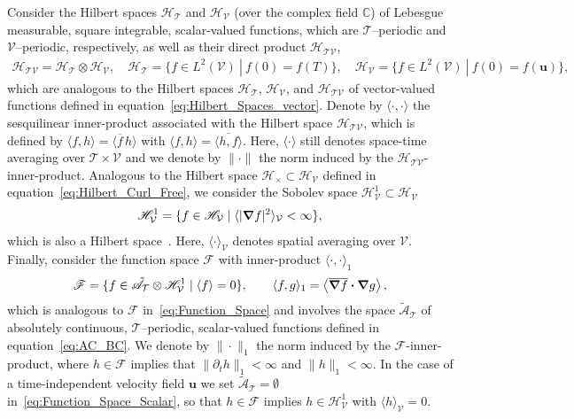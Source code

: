\documentclass[leqno,onefignum,onetabnum]{siamltex1213}
\newcommand{\Tc}{\mathcal{T}}
\newcommand{\Vc}{\mathcal{V}}
\newcommand{\Hc}{\mathcal{H}}
\newcommand{\Fc}{\mathcal{F}}
\newcommand{\Hs}{\mathscr{H}}
\newcommand{\As}{\mathscr{A}}
\newcommand{\Fs}{\mathscr{F}}
\newcommand\bnabla{\mbox{\boldmath${\nabla}$}}
\providecommand\bcdot{\boldsymbol{\cdot}}
\newcommand{\vecu}{\boldsymbol{u}}
\begin{document}
Consider the Hilbert
spaces $\Hs_{\Tc}$ and $\Hs_{\Vc}$
(over the complex field $\mathbb{C}$) of Lebesgue measurable, square
integrable,
scalar-valued functions,
which are $\Tc$--periodic and $\Vc$--periodic, respectively, as well
as their direct product $\Hs_{\Tc\Vc}$,  
%
\begin{align}%
  \Hs_{\Tc\Vc}=\Hs_{\Tc}\otimes\Hs_{\Vc}, \quad
  \Hs_{\Tc}=\{f\in L^2(\Vc) \ | \ f(0)=f(T)\}, \quad
  \Hs_{\Vc}=\{f\in L^2(\Vc) \ | \ f(0)=f(\vecu )\},
\end{align}
%
which are analogous to the Hilbert spaces $\Hc_{\Tc}$, $\Hc_{\Vc}$,
and $\Hc_{\Tc\Vc}$ of vector-valued functions defined in
equation~\eqref{eq:Hilbert_Spaces_vector}. Denote by $\langle\cdot,\cdot\rangle$ the sesquilinear 
inner-product associated with the Hilbert space $\Hs_{\Tc\Vc}$, which
is defined by $\langle f,h\rangle=\langle\overline{f}\, h\rangle$ with
$\langle f,h\rangle=\overline{\langle h,f\rangle}$. Here, $\langle\cdot\rangle$ still denotes space-time
averaging over $\Tc\times\Vc$ and we denote by $\|\cdot\|$ the norm induced by
the $\Hs_{\Tc\Vc}$-inner-product. Analogous to the Hilbert space
$\Hc_\times\subset\Hc_{\Vc}$ defined in equation~\eqref{eq:Hilbert_Curl_Free}, we
consider the Sobolev space $\Hs^1_{\Vc}\subset\Hs_{\Vc}$     
% 
\begin{align}%
  \Hs^1_{\Vc}=\{f\in \Hs_{\Vc} \; | \; \langle|\bnabla f|^2\rangle_{\Vc}<\infty\}, 
\end{align}
%
which is also a Hilbert space~\cite{Folland:95}. Here, $\langle\cdot\rangle_{\Vc}$
denotes spatial averaging over $\Vc$. Finally, consider the 
function space $\Fs$ with inner-product $\langle\cdot,\cdot\rangle_1$
%
\begin{align}%
  \Fs=\{f\in\tilde{\As}_{\Tc}\otimes\Hs^1_{\Vc} \; | \; \langle f\rangle=0\},  \qquad
  \langle f,g\rangle_1=\left\langle\overline{\bnabla f}\bcdot\bnabla g\right\rangle,
\end{align}
%
which is analogous to $\Fc$ in~\eqref{eq:Function_Space} and involves
the space $\tilde{\As}_{\Tc}$ of absolutely continuous,
$\Tc$--periodic, scalar-valued functions defined in equation~\eqref{eq:AC_BC}.    
We denote by $\|\cdot\|_1$ the norm induced by the $\Fs$-inner-product,
where $h\in\Fs$ implies that $\|\partial_th\|_1<\infty$ and $\|h\|_1<\infty$. In the
case of a time-independent velocity field $\vecu $ we set
$\tilde{\As}_{\Tc}=\emptyset$ in~\eqref{eq:Function_Space_Scalar}, so that
$h\in\Fs$ implies $h\in\Hs^1_{\Vc}$ with $\langle h\rangle_{\Vc}=0$.
\end{document}
